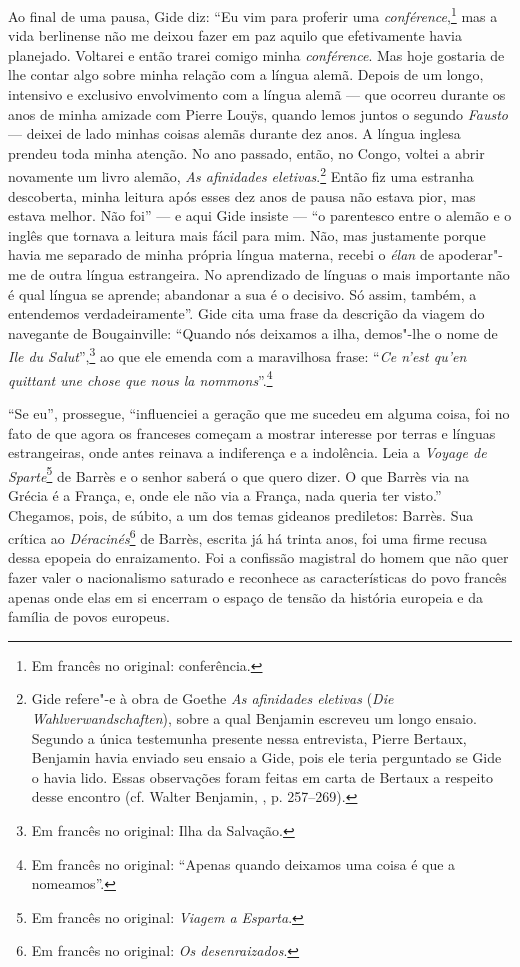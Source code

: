 Ao final de uma pausa, Gide diz: ``Eu vim para proferir uma
\emph{conférence},\footnote{Em francês no original: conferência. \versal{[N.~T.]}} mas a vida
berlinense não me deixou fazer em paz aquilo que efetivamente havia
planejado. Voltarei e então trarei comigo minha \emph{conférence}. Mas
hoje gostaria de lhe contar algo sobre minha relação com a língua alemã.
Depois de um longo, intensivo e exclusivo envolvimento com a língua
alemã --- que ocorreu durante os anos de minha amizade com Pierre Louÿs,
quando lemos juntos o segundo \emph{Fausto} --- deixei de lado minhas
coisas alemãs durante dez anos. A língua inglesa prendeu toda minha
atenção. No ano passado, então, no Congo, voltei a abrir novamente um
livro alemão, \emph{As afinidades eletivas}.\footnote{Gide
  refere"-e à obra de Goethe \emph{As afinidades eletivas} (\emph{Die
  Wahlverwandschaften}), sobre a qual Benjamin escreveu um longo ensaio.
  Segundo a única testemunha presente nessa entrevista, Pierre Bertaux,
  Benjamin havia enviado seu ensaio a Gide, pois ele teria perguntado se
  Gide o havia lido. Essas observações foram feitas em carta de Bertaux
  a respeito desse encontro (cf. Walter Benjamin, ,
  p. 257--269). \versal{[N.~T.]}} Então fiz uma estranha descoberta, minha leitura após esses
dez anos de pausa não estava pior, mas estava melhor. Não foi'' --- e aqui
Gide insiste --- ``o parentesco entre o alemão e o inglês que tornava a
leitura mais fácil para mim. Não, mas justamente porque havia me
separado de minha própria língua materna, recebi o \emph{élan} de
apoderar"-me de outra língua estrangeira. No aprendizado de línguas o
mais importante não é qual língua se aprende; abandonar a sua é o
decisivo. Só assim, também, a entendemos verdadeiramente''. Gide cita
uma frase da descrição da viagem do navegante de Bougainville: ``Quando
nós deixamos a ilha, demos"-lhe o nome de \emph{Ile du Salut}'',\footnote{Em francês no original: Ilha da Salvação. \versal{[N.~T.]}} ao que ele emenda com a maravilhosa
frase: ``\emph{Ce n'est qu'en quittant une chose que nous la
nommons}''.\footnote{Em francês no original: ``Apenas quando deixamos uma coisa é que a
  nomeamos''. \versal{[N.~T.]}}

``Se eu'', prossegue, ``influenciei a geração que me sucedeu em alguma
coisa, foi no fato de que agora os franceses começam a mostrar interesse
por terras e línguas estrangeiras, onde antes reinava a indiferença e a
indolência. Leia a \emph{Voyage de Sparte}\footnote{Em francês no original: \emph{Viagem
  a Esparta}. \versal{[N.~T.]}} de Barrès e o senhor saberá o que quero dizer. O que
Barrès via na Grécia é a França, e, onde ele não via a França, nada
queria ter visto.'' Chegamos, pois, de súbito, a um dos temas gideanos
prediletos: Barrès. Sua crítica ao \emph{Déracinés}\footnote{Em francês no original: \emph{Os desenraizados}. \versal{[N.~T.]}} de Barrès, escrita já há trinta anos, foi uma firme recusa dessa
epopeia do enraizamento. Foi a confissão magistral do homem que não quer
fazer valer o nacionalismo saturado e reconhece as características do
povo francês apenas onde elas em si encerram o espaço de tensão da
história europeia e da família de povos europeus.

